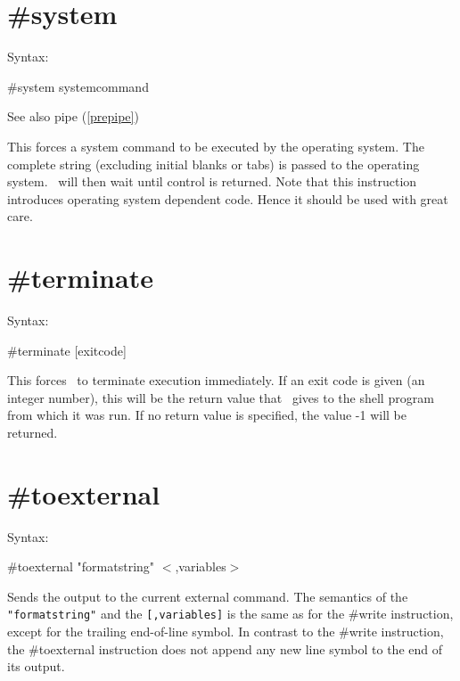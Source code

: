  
\section{\#system}
\label{presystem}

\noindent Syntax:

\#system systemcommand
 
\noindent See also pipe (\ref{prepipe})

\noindent This forces a system command to be executed by 
the operating system. The complete string (excluding initial blanks or 
tabs) is passed to the operating system. \FORM\ will then wait until control 
is returned. Note that this instruction introduces operating system 
dependent code. Hence it should be used with great care.

 
\section{\#terminate}
\label{preterminate}

\noindent Syntax:

\#terminate [exitcode]
 
\noindent This forces \FORM\ to terminate execution 
immediately. If an exit code is given (an integer number), this will be the 
return value that \FORM\ gives to the shell program from which it was run. If 
no return value is specified, the value -1 will be returned.


\section{\#toexternal}
\label{pretoexternal}

\noindent Syntax:

\#toexternal "formatstring" $<$,variables$>$

\noindent Sends the output to the current external 
command. The semantics of the \verb|"formatstring"| and the
\verb|[,variables]| is the same as for the \#write 
instruction, except for the trailing end-of-line symbol. In contrast to the 
\#write instruction, the \#toexternal instruction does not append any new 
line symbol to the end of its output.


